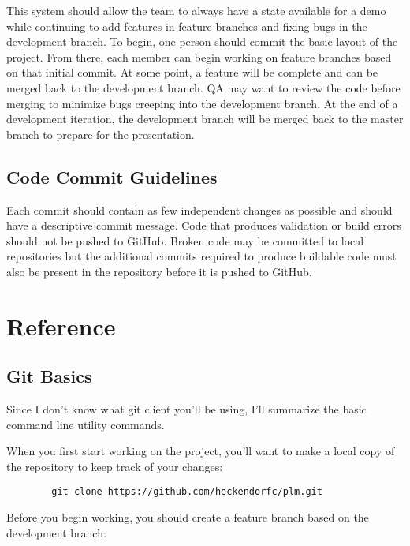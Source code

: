 \documentclass{article}
\begin{document}
	This system should allow the team to always have a state available for a demo while continuing to add features in feature branches and fixing bugs in the development branch. To begin, one person should commit the basic layout of the project. From there, each member can begin working on feature branches based on that initial commit. At some point, a feature will be complete and can be merged back to the development branch. QA may want to review the code before merging to minimize bugs creeping into the development branch. At the end of a development iteration, the development branch will be merged back to the master branch to prepare for the presentation.

	\subsection {Code Commit Guidelines}

	Each commit should contain as few independent changes as possible and should have a descriptive commit message. Code that produces validation or build errors should not be pushed to GitHub. Broken code may be committed to local repositories but the additional commits required to produce buildable code must also be present in the repository before it is pushed to GitHub.

	\section{Reference}

	\subsection{Git Basics}

	Since I don't know what git client you'll be using, I'll summarize the basic command line utility commands.

	When you first start working on the project, you'll want to make a local copy of the repository to keep track of your changes:

	\begin{minipage}{0.95\textwidth}\begin{lstlisting}
	    git clone https://github.com/heckendorfc/plm.git
	\end{lstlisting}\end{minipage}

	Before you begin working, you should create a feature branch based on the development branch:
\end{document}
